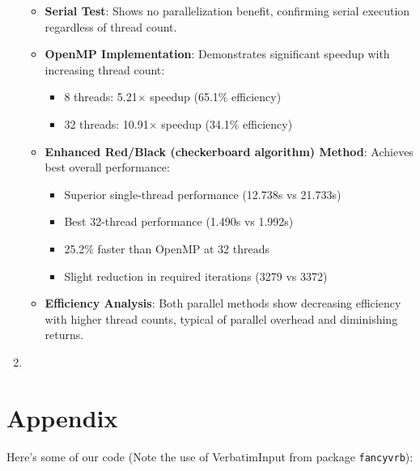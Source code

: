 \documentclass[11pt]{article}
\begin{document}
\begin{enumerate}
{  \begin{itemize}
    \item \textbf{Serial Test}: Shows no parallelization benefit, confirming serial execution regardless of thread count.
    
    \item \textbf{OpenMP Implementation}: Demonstrates significant speedup with increasing thread count:
      \begin{itemize}
      \item 8 threads: 5.21$\times$ speedup (65.1\% efficiency)
      \item 32 threads: 10.91$\times$ speedup (34.1\% efficiency)
      \end{itemize}
    
    \item \textbf{Enhanced Red/Black (checkerboard algorithm) Method}: Achieves best overall performance:
      \begin{itemize}
      \item Superior single-thread performance (12.738s vs 21.733s)
      \item Best 32-thread performance (1.490s vs 1.992s)
      \item 25.2\% faster than OpenMP at 32 threads
      \item Slight reduction in required iterations (3279 vs 3372)
      \end{itemize}
    
    \item \textbf{Efficiency Analysis}: Both parallel methods show decreasing efficiency with higher thread counts, typical of parallel overhead and diminishing returns.
  
  \end{itemize}
}


\item{

}

\end{enumerate}
%

\newpage{}




 


\newpage

\section{Appendix}

Here's some of our code (Note the use of VerbatimInput from package \texttt{fancyvrb}):
\end{document}
